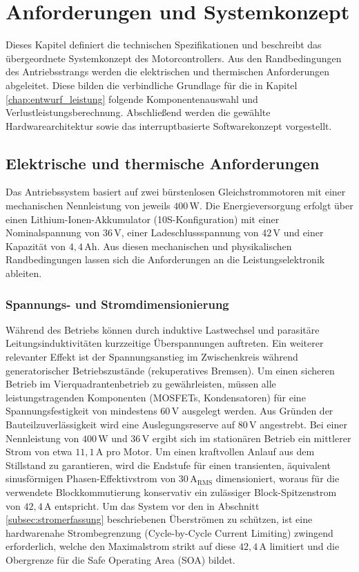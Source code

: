 \chapter{Anforderungen und Systemkonzept}
\label{chap:anforderungen}

Dieses Kapitel definiert die technischen Spezifikationen und beschreibt das übergeordnete Systemkonzept des Motorcontrollers. Aus den Randbedingungen des Antriebsstrangs werden die elektrischen und thermischen Anforderungen abgeleitet. Diese bilden die verbindliche Grundlage für die in Kapitel \ref{chap:entwurf_leistung} folgende Komponentenauswahl und Verlustleistungsberechnung. Abschließend werden die gewählte Hardwarearchitektur sowie das interruptbasierte Softwarekonzept vorgestellt.

\section{Elektrische und thermische Anforderungen}
\label{sec:anforderungen_spezifikationen}

Das Antriebssystem basiert auf zwei bürstenlosen Gleichstrommotoren mit einer mechanischen Nennleistung von jeweils $400\,\mathrm{W}$. Die Energieversorgung erfolgt über einen Lithium-Ionen-Akkumulator (10S-Konfiguration) mit einer Nominalspannung von $36\,\mathrm{V}$, einer Ladeschlussspannung von $42\,\mathrm{V}$ und einer Kapazität von $4{,}4\,\mathrm{Ah}$. Aus diesen mechanischen und physikalischen Randbedingungen lassen sich die Anforderungen an die Leistungselektronik ableiten.

\subsection{Spannungs- und Stromdimensionierung}
Während des Betriebs können durch induktive Lastwechsel und parasitäre Leitungsinduktivitäten kurzzeitige Überspannungen auftreten. Ein weiterer relevanter Effekt ist der Spannungsanstieg im Zwischenkreis während generatorischer Betriebszustände (rekuperatives Bremsen). Um einen sicheren Betrieb im Vierquadrantenbetrieb zu gewährleisten, müssen alle leistungstragenden Komponenten (MOSFETs, Kondensatoren) für eine Spannungsfestigkeit von mindestens $60\,\mathrm{V}$ ausgelegt werden. Aus Gründen der Bauteilzuverlässigkeit wird eine Auslegungsreserve auf $80\,\mathrm{V}$ angestrebt.
Bei einer Nennleistung von $400\,\mathrm{W}$ und $36\,\mathrm{V}$ ergibt sich im stationären Betrieb ein mittlerer Strom von etwa $11{,}1\,\mathrm{A}$ pro Motor. Um einen kraftvollen Anlauf aus dem Stillstand zu garantieren, wird die Endstufe für einen transienten, äquivalent sinusförmigen Phasen-Effektivstrom von $30\,\mathrm{A_{RMS}}$ dimensioniert, woraus für die verwendete Blockkommutierung konservativ ein zulässiger Block-Spitzenstrom von $42{,}4\,\mathrm{A}$ entspricht. Um das System vor den in Abschnitt \ref{subsec:stromerfassung} beschriebenen Überströmen zu schützen, ist eine hardwarenahe Strombegrenzung (Cycle-by-Cycle Current Limiting) zwingend erforderlich, welche den Maximalstrom strikt auf diese $42{,}4\,\mathrm{A}$ limitiert und die Obergrenze für die Safe Operating Area (SOA) bildet.


